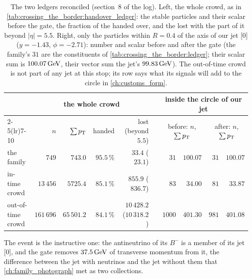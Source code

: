\begin{table}[htbp]\centering\small
\caption[The two ledgers reconciled: whole collisions and the circle of our
jet]{The two ledgers reconciled (section~8 of the  log). Left, the
whole crowd, as in \cref{tab:crossing_the_border:handover_ledger}: the
stable particles and their scalar \pt before the gate, the fraction of the
\pt handed over, and the \pt lost with the part of it beyond $|\eta|=5.5$.
Right, only the particles within $R=0.4$ of the axis of our jet [0]
($y=-1.43$, $\phi=-2.71$): number and scalar \pt before and after the gate
(the family's $31$ are the constituents of
\cref{tab:crossing_the_border:ledger}; their scalar sum is $100.07\,\mathrm{GeV}$,
their vector sum the jet's $99.83\,\mathrm{GeV}$). The out-of-time crowd is not part
of any jet at this stop; its row says what its signals will add to the
circle in \cref{ch:customs_form}.}
\label{tab:crossing_the_border:cone}
\setlength{\tabcolsep}{4pt}
\begin{tabular}{@{}lrrrrcrrrr@{}}\toprule
 & \multicolumn{4}{c}{the whole crowd} & & \multicolumn{4}{c}{inside the circle of our jet} \\
\cmidrule(lr){2-5}\cmidrule(lr){7-10}
 & $n$ & $\sum p_{\mathrm{T}}$ & handed & lost (beyond $5.5$) & & \multicolumn{2}{c}{before: $n$, $\sum p_{\mathrm{T}}$} & \multicolumn{2}{c}{after: $n$, $\sum p_{\mathrm{T}}$} \\ \midrule
the family & $749$ & $743.0$ & $95.5\,\%$ & $33.4$ ($23.1$) & & $31$ & $100.07$ & $31$ & $100.07$ \\
in-time crowd & $13\,456$ & $5725.4$ & $85.1\,\%$ & $855.9$ ($836.7$) & & $83$ & $34.00$ & $81$ & $33.87$ \\
out-of-time crowd & $161\,696$ & $65\,501.2$ & $84.1\,\%$ & $10\,428.2$ ($10\,318.2$) & & $1000$ & $401.30$ & $981$ & $401.08$ \\
\bottomrule
\end{tabular}
\end{table}

The \CMSSW event is the instructive one: the antineutrino of its $B^-$ is a
member of its jet [0], and the gate removes $37.5\,\mathrm{GeV}$ of transverse
momentum from it, the difference between the jet with neutrinos and the jet
without them that \cref{ch:family_photograph} met as two collections.

